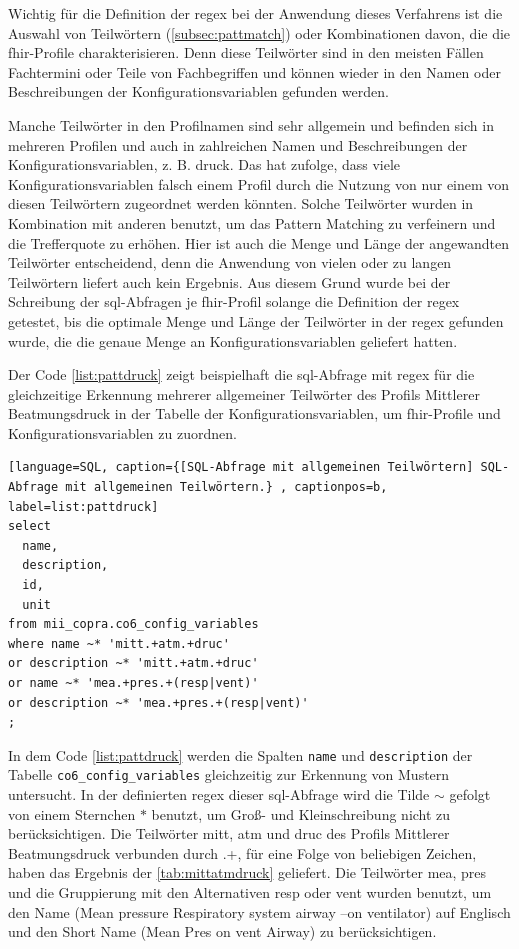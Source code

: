Wichtig für die Definition der \acs{regex} bei der Anwendung dieses Verfahrens ist die Auswahl von Teilwörtern (\ref{subsec:pattmatch}) oder Kombinationen davon, die die \ac{fhir}-Profile charakterisieren. Denn diese Teilwörter sind in den meisten Fällen Fachtermini oder Teile von Fachbegriffen und können wieder in den Namen oder Beschreibungen der Konfigurationsvariablen gefunden werden.

 Manche Teilwörter in den Profilnamen sind sehr allgemein und befinden sich in mehreren Profilen und auch in zahlreichen Namen und Beschreibungen der Konfigurationsvariablen, z. B. \glqq druck\grqq{}. Das hat zufolge, dass viele Konfigurationsvariablen falsch einem Profil durch die Nutzung von nur einem von diesen Teilwörtern zugeordnet werden könnten. Solche Teilwörter wurden in Kombination mit anderen benutzt, um das Pattern Matching zu verfeinern und die Trefferquote zu erhöhen. Hier ist auch die Menge und Länge der angewandten Teilwörter entscheidend, denn die Anwendung von vielen oder zu langen Teilwörtern liefert auch kein Ergebnis. Aus diesem Grund wurde bei der Schreibung der \ac{sql}-Abfragen je \ac{fhir}-Profil solange die Definition der \ac{regex} getestet, bis die optimale Menge und Länge der Teilwörter in der \ac{regex} gefunden wurde, die die genaue Menge an Konfigurationsvariablen geliefert hatten.

Der Code \ref{list:pattdruck} zeigt beispielhaft die \ac{sql}-Abfrage mit \ac{regex} für die gleichzeitige Erkennung mehrerer allgemeiner Teilwörter des Profils \glqq Mittlerer Beatmungsdruck\grqq{} in der Tabelle der Konfigurationsvariablen, um \ac{fhir}-Profile und Konfigurationsvariablen zu zuordnen.
\clearpage
\begin{lstlisting}[language=SQL, caption={[SQL-Abfrage mit allgemeinen Teilwörtern] SQL-Abfrage mit allgemeinen Teilwörtern.} , captionpos=b, label=list:pattdruck]
select 
  name, 
  description, 
  id, 
  unit
from mii_copra.co6_config_variables 
where name ~* 'mitt.+atm.+druc'
or description ~* 'mitt.+atm.+druc'
or name ~* 'mea.+pres.+(resp|vent)'
or description ~* 'mea.+pres.+(resp|vent)'
;
\end{lstlisting}

In dem Code \ref{list:pattdruck} werden die Spalten \texttt{name} und \texttt{description} der Tabelle \texttt{co6\_config\_variables} gleichzeitig zur Erkennung von Mustern untersucht. In der definierten \ac{regex} dieser \ac{sql}-Abfrage wird die Tilde \glqq$\sim$\grqq{} gefolgt von einem Sternchen \glqq$\ast$\grqq{} benutzt, um Groß- und Kleinschreibung nicht zu berücksichtigen. Die Teilwörter \glqq mitt\grqq{}, \glqq atm\grqq{} und \glqq druc\grqq{} des Profils \glqq Mittlerer Beatmungsdruck\grqq{} verbunden durch \glqq .+\grqq{}, für eine Folge von beliebigen Zeichen, haben das Ergebnis der \ref{tab:mittatmdruck} geliefert. Die Teilwörter \glqq mea\grqq{}, \glqq pres\grqq{} und die Gruppierung mit den Alternativen \glqq resp\grqq{} oder \glqq vent \grqq{} wurden benutzt, um den Name (Mean pressure Respiratory system airway --on ventilator) auf Englisch und den \glqq Short Name\grqq{} (Mean Pres on vent Airway) zu berücksichtigen.

